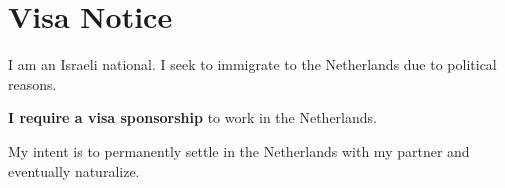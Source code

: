 \section{Visa Notice}
\begin{itemList}
\item I am an Israeli national. I seek to immigrate to the
  Netherlands due to political reasons.
\item \textbf{I require a visa sponsorship} to work in the Netherlands.
\item My intent is to permanently settle in the Netherlands with my
  partner and eventually naturalize.
\end{itemList}